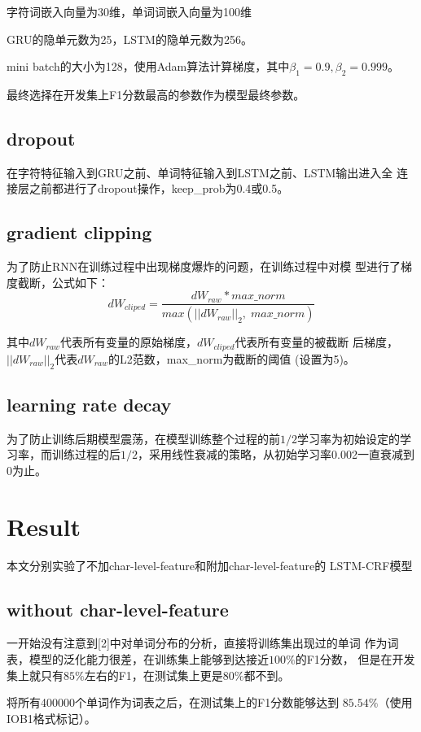 \documentclass{article} %
\begin{document}
\qquad 字符词嵌入向量为30维，单词词嵌入向量为100维

\qquad GRU的隐单元数为25，LSTM的隐单元数为256。

\qquad mini batch的大小为128，使用Adam算法计算梯度，其中$\beta_1=0.9,
\beta_2=0.999$。

\qquad 最终选择在开发集上F1分数最高的参数作为模型最终参数。

\subsection{dropout}
\qquad 在字符特征输入到GRU之前、单词特征输入到LSTM之前、LSTM输出进入全
连接层之前都进行了dropout操作，keep\_prob为0.4或0.5。

\subsection{gradient clipping}
\qquad 为了防止RNN在训练过程中出现梯度爆炸的问题，在训练过程中对模
型进行了梯度截断，公式如下：
$$dW_{cliped} = \frac{dW_{raw} * max\_norm}{max(||dW_{raw}||_2, \;max\_norm)}$$

\qquad 其中$dW_{raw}$代表所有变量的原始梯度，$dW_{cliped}$代表所有变量的被截断
后梯度，$||dW_{raw}||_2$代表$dW_{raw}$的L2范数，max\_norm为截断的阈值
(设置为5)。

\subsection{learning rate decay}
\qquad 为了防止训练后期模型震荡，在模型训练整个过程的前$1/2$学习率为初始设定的学习率，而训练过程的后$1/2$，采用线性衰减的策略，从初始学习率0.002一直衰减到0为止。

\section{Result}
\qquad 本文分别实验了不加char-level-feature和附加char-level-feature的
LSTM-CRF模型

\subsection{without char-level-feature}
\qquad 一开始没有注意到[2]中对单词分布的分析，直接将训练集出现过的单词
作为词表，模型的泛化能力很差，在训练集上能够到达接近$100\%$的F1分数，
但是在开发集上就只有$85\%$左右的F1，在测试集上更是$80\%$都不到。

\qquad 将所有400000个单词作为词表之后，在测试集上的F1分数能够达到
$85.54\%$（使用IOB1格式标记）。
\end{document}
